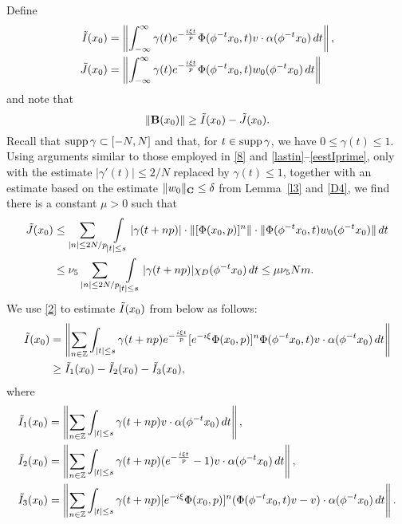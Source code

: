 Define
\begin{align*}
\tilde I (x_0) &=  \left\|\int_{-\infty}^\infty \gamma (t) e^{-\frac{i\xi t}p}
\Phi (\phi^{-t} x_0, t) v \cdot\alpha (\phi^{-t} x_0) \, dt \right\|,\\
\tilde J (x_0) & = \left\| \int_{-\infty}^\infty \gamma (t) e^{-\frac{i\xi
t}p} \Phi (\phi^{-t} x_0, t) w_0 (\phi^{-t} x_0)  \,dt \right\|
\end{align*}
and note that
\begin{equation}
\| \bB(x_0)\| \geq \ti I (x_0) - \ti J (x_0).
\lb{9}
\end{equation}
Recall that $\operatorname{supp}\gamma\subset [-N,N]$ and that, for $t\in \operatorname{supp}\gamma$,
we have $0\le\gamma(t)\leq 1$.
Using  arguments similar to those employed in \eqref{8} 
and \eqref{lastin}--\eqref{eestIprime}, only with the estimate
$|\gamma'(t)|\leq 2/N$ replaced by $\gamma(t)\leq 1$, 
together with an estimate 
based on the estimate
$\|w_0\|_{{\bold C}}\leq \delta$ from Lemma~\ref{l3} and \eqref{D4},
we find there is a constant $\mu>0$ such that
\begin{align}
\ti J(x_0) & \leq
\sum\limits_{|n|\leq 2N/p}\int\limits_{|t|\leq s}
|\gamma(t+np)|\cdot \|[\Phi(x_0,p)]^n\|
\cdot \|\Phi(\phi^{-t}x_0,t)w_0(\phi^{-t}x_0)\|\,dt \nonumber\\
& \leq \nu_5
\sum\limits_{|n|\leq 2N/p}\int\limits_{|t|\leq s}
|\gamma(t+np)|\chi_D(\phi^{-t}x_0)\,dt
\leq\mu \nu_5 Nm.
\lb{10}
\end{align}
We use \eqref{2} to estimate $\tilde I (x_0)$ from below as follows:
\begin{align*}
\tilde I (x_0) & = \left\| \sum_{n\in{\Bbb{Z}}} \int_{|t| \leq s} \gamma (t+ np)
e^{-\frac{i\xi t}p} [e^{-i\xi} \Phi (x_0, p) ]^n \Phi (\phi^{-t} x_0, t)
v \cdot \alpha (\phi^{-t} x_0) \, dt \right\|\\
& \geq \tilde I_1(x_0) - \tilde I_2 (x_0) - \tilde I_3 (x_0),
\end{align*}
where
\begin{align*}
\tilde I_1 (x_0) & = \left\| \sum_{n\in{\Bbb{Z}}} \int_{|t| \leq s} \gamma (t+ np)
v \cdot \alpha (\phi^{-t} x_0) \, dt \right\|,\\
\tilde I_2 (x_0) & = \left\| \sum_{n\in{\Bbb{Z}}} \int_{|t| \leq s} \gamma (t+ np)
( e^{-\frac{i\xi t}p} -1) v \cdot \alpha (\phi^{-t} x_0) \, dt
\right\|,\\
\tilde I_3 (x_0) & = \left\| \sum_{n\in{\Bbb{Z}}} \int_{|t| \leq s} \gamma(t+np) [
e^{-i\xi} \Phi (x_0, p) ]^n (\Phi (\phi^{-t} x_0, t) v-v) \cdot \alpha
(\phi^{-t} x_0) \,dt \right\|.
\end{align*}


